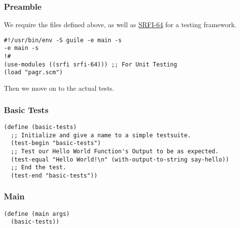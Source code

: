 \documentclass[11pt]{article}
\begin{document}
\subsubsection{Preamble}
\label{sec:orga1882a8}
We require the files defined above, as well as \href{https://srfi.schemers.org/srfi-64/srfi-64.html}{SRFI-64} for a testing
framework.

\begin{verbatim}
#!/usr/bin/env -S guile -e main -s
-e main -s
!#
(use-modules ((srfi srfi-64))) ;; For Unit Testing
(load "pagr.scm")
\end{verbatim}

Then we move on to the actual tests.

\subsubsection{Basic Tests}
\label{sec:org77b04f1}

\begin{verbatim}
(define (basic-tests)
  ;; Initialize and give a name to a simple testsuite.
  (test-begin "basic-tests")
  ;; Test our Hello World Function's Output to be as expected.
  (test-equal "Hello World!\n" (with-output-to-string say-hello))
  ;; End the test.
  (test-end "basic-tests"))
\end{verbatim}

\subsubsection{Main}
\label{sec:orgd9f2256}

\begin{verbatim}
(define (main args)
  (basic-tests))
\end{verbatim}
\end{document}
